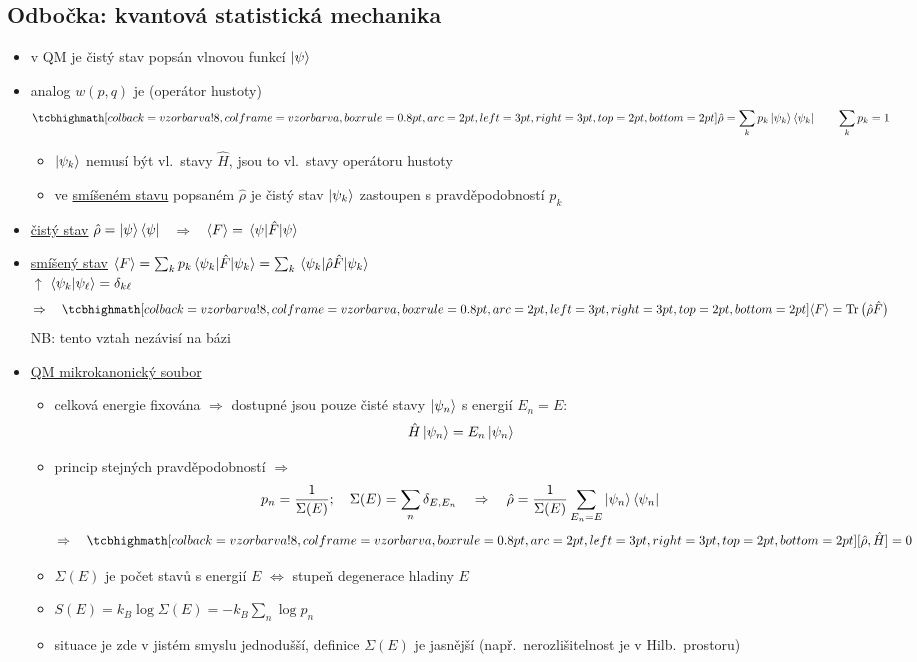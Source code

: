\subsection{\textcolor{OliveGreen}{Odbočka: kvantová statistická mechanika}}
{\color{OliveGreen}
\begin{itemize}
  \item v QM je čistý stav popsán vlnovou funkcí $\ket{\psi}$
  \item analog $w(p,q)$ je  (operátor hustoty)
  \[
    \vzorec{\hat\rho = \sum_kp_k\ket{\psi_k}\bra{\psi_k}} \qquad \sum_kp_k = 1
  \]
  \begin{itemize}
    \item $\ket{\psi_k}$ nemusí být vl.\ stavy $\hat H$, jsou to vl.\ stavy operátoru hustoty
    \item ve \underline{smíšeném stavu} popsaném $\hat\rho$ je čistý stav $\ket{\psi_k}$ zastoupen s pravděpodobností $p_k$
  \end{itemize}
  \item \underline{čistý stav} \quad $\hat\rho = \ket{\psi}\bra{\psi}$ \ $\Rightarrow$ \ $\langle F\rangle = \mel{\psi}{\hat F}{\psi}$
  \item \underline{smíšený stav} \quad $\langle F\rangle = \sum_kp_k\mel{\psi_k}{\hat F}{\psi_k} = \sum_k\mel{\psi_k}{\hat\rho\hat F}{\psi_k}$ \\
        \hspace*{6.6cm}$\uparrow$ $\braket{\psi_k}{\psi_\ell} = \delta_{k\ell}$
  \[
    \Rightarrow\quad \vzorec{\langle F\rangle = \operatorname{Tr}\big(\hat\rho\hat F\big)}
  \]
  \hspace*{3cm}NB: tento vztah nezávisí na bázi
  \item \underline{QM mikrokanonický soubor}
  \begin{itemize}
    \item[--] celková energie fixována $\Rightarrow$ dostupné jsou pouze čisté stavy $\ket{\psi_n}$ s energií $E_n = E$:
    \[
      \hat H\ket{\psi_n} = E_n\ket{\psi_n}
    \]
    \item[--] princip stejných pravděpodobností $\Rightarrow$
    \[
      p_n = \frac{1}{\Sigma(E)}; \quad \Sigma(E) = \sum_n\delta_{E,E_n}
      \quad\Rightarrow\quad \hat\rho = \frac{1}{\Sigma(E)}\sum_{E_n = E}\ket{\psi_n}\bra{\psi_n}
    \]
    \[
      \Rightarrow\quad \vzorec{[\hat\rho,\hat H] = 0}
    \]
  \end{itemize}
  \begin{itemize}[label=$\to$]
    \item $\Sigma(E)$ je počet stavů s energií $E$ $\Leftrightarrow$ stupeň degenerace hladiny $E$
    \item $S(E) = k_B\log\Sigma(E) = -k_B\sum_n\log p_n$ 
    \item situace je zde v jistém smyslu jednodušší, definice $\Sigma(E)$ je jasnější (např.\ nerozlišitelnost je  v Hilb.\ prostoru)
  \end{itemize}
\end{itemize}
}

